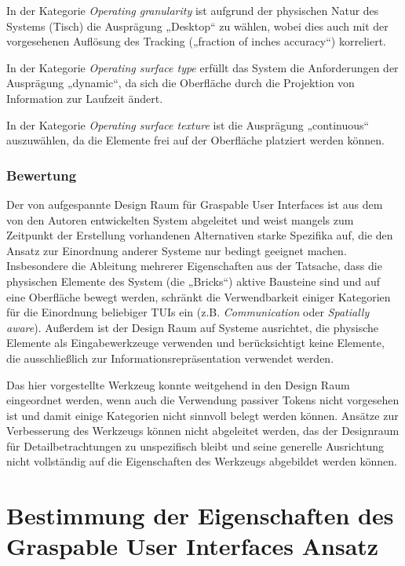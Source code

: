 In der Kategorie \emph{Operating granularity} ist aufgrund der physischen Natur des Systems (Tisch) die Ausprägung „Desktop“ zu wählen, wobei dies auch mit der vorgesehenen Auflösung des Tracking („fraction of inches accuracy“) korreliert.

In der Kategorie \emph{Operating surface type} erfüllt das System die Anforderungen der Ausprägung „dynamic“, da sich die Oberfläche durch die Projektion von Information zur Laufzeit ändert.

In der Kategorie \emph{Operating surface texture} ist die Ausprägung „continuous“ auszuwählen, da die Elemente frei auf der Oberfläche platziert werden können.

\subsubsection{Bewertung}

Der von \citet{Fitzmaurice95} aufgespannte Design Raum für Graspable User Interfaces ist aus dem von den Autoren entwickelten System abgeleitet und weist mangels zum Zeitpunkt der Erstellung vorhandenen Alternativen starke Spezifika auf, die den Ansatz zur Einordnung anderer Systeme nur bedingt geeignet machen. Insbesondere die Ableitung mehrerer Eigenschaften aus der Tatsache, dass die physischen Elemente des System (die „Bricks“) aktive Bausteine sind und auf eine Oberfläche bewegt werden, schränkt die Verwendbarkeit einiger Kategorien für die Einordnung beliebiger \glspl{TUI} ein (z.B. \emph{Communication} oder \emph{Spatially aware}). Außerdem ist der Design Raum auf Systeme ausrichtet, die physische Elemente als Eingabewerkzeuge verwenden und berücksichtigt keine Elemente, die ausschließlich zur Informationsrepräsentation verwendet werden.

Das hier vorgestellte Werkzeug konnte weitgehend in den Design Raum eingeordnet werden, wenn auch die Verwendung passiver Tokens nicht vorgesehen ist und damit einige Kategorien nicht sinnvoll belegt werden können. Ansätze zur Verbesserung des Werkzeugs können nicht abgeleitet werden, das der Designraum für Detailbetrachtungen zu unspezifisch bleibt und seine generelle Ausrichtung nicht vollständig auf die Eigenschaften des Werkzeugs abgebildet werden können.


\section{Bestimmung der Eigenschaften des Graspable User Interfaces Ansatz} %
\label{sec:bestimmung_der_eigenschaften_des_graspable_user_interfaces_ansatz}

